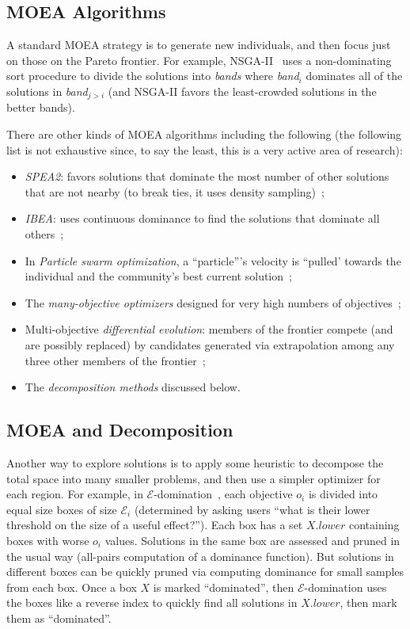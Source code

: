\documentclass[10pt,journal,compsoc]{IEEEtran}
\newcommand{\bi}{\begin{itemize}}
\newcommand{\ei}{\end{itemize}}
\newenvironment{changed}{\par}{\par}
\begin{document}
\subsection{MOEA Algorithms}\label{sec:algo}
A standard MOEA strategy is to generate new individuals, and then focus just on those on the Pareto frontier. 
For example, NSGA-II~\cite{deb00afast} uses a non-dominating sort procedure to divide the solutions into {\em bands} where {\em band}$_i$ dominates all of the solutions in {\em band}$_{j>i}$ (and NSGA-II favors the least-crowded solutions in the better bands).

\begin{changed}

There are other kinds of MOEA algorithms including the following (the following list is not exhaustive since, to say the least, this is a very active area of research):
\bi
\item
{\em SPEA2}: favors solutions that dominate the most number of other solutions that are not nearby (to break ties, it uses density sampling)~\cite{zit02}; 
\item {\em  IBEA}: uses continuous dominance to find the solutions that dominate all others~\cite{Zitzler04indicator-basedselection}; 
\item In {\em Particle swarm optimization}, a ``particle'''s velocity is 
``pulled' towards the individual and the community's best current solution~\cite{pan08,V.Sedenka2010,Kennedy:2001:SI:370449,Poli07particleswarm};
\item 
The {\em many-objective optimizers}  designed for very high numbers of objectives~\cite{deb14}; 
\item
Multi-objective {\em differential evolution}: members of the frontier compete (and are possibly replaced) by candidates generated via extrapolation among  any three other members of the frontier~\cite{storn97,5601760};
\item
The {\em decomposition methods} discussed below.
\ei 


\subsection{MOEA and Decomposition}\label{sec:decomp}

Another way to explore solutions is to apply some heuristic to decompose the total space into many smaller problems, and then use a simpler optimizer for each region. 
For example, in $\mathcal{E}$-domination~\cite{deb05}, each objective $o_i$ is divided into equal size boxes of size $\mathcal{E}_i$ (determined by asking users ``what is their lower threshold on the size of a useful effect?'').  
Each box has a set $X.\mathit{lower}$ containing boxes with worse $o_i$ values.  
Solutions in the same box are assessed and pruned in the usual way (all-pairs computation of a dominance function). 
But solutions in different boxes can be quickly pruned via computing dominance for small samples from each box. 
Once a box $X$ is marked ``dominated'', then $\mathcal{E}$-domination uses the boxes like a reverse index to quickly find all solutions in $X.\mathit{lower}$, then mark them as ``dominated''.


\end{changed}
\end{document}
